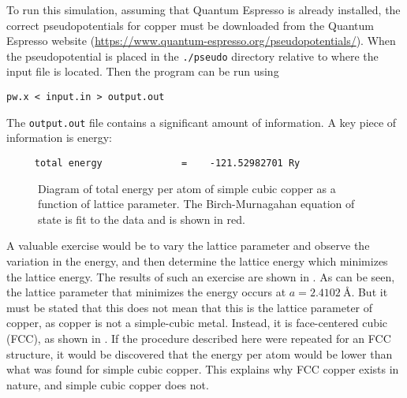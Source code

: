 To run this simulation, assuming that Quantum Espresso is already installed,
the correct pseudopotentials for copper must be downloaded from the
Quantum Espresso
website
(\href{https://www.quantum-espresso.org/pseudopotentials/}{https://www.quantum-espresso.org/pseudopotentials/}).
When the pseudopotential is placed in the \texttt{./pseudo} directory relative
to where the input file is located. Then the program can be run using

\begin{tcolorbox}[colback=gray!10, colframe=gray!30, boxrule=0.5pt, breakable]
\begin{verbatim}
pw.x < input.in > output.out
\end{verbatim}
\end{tcolorbox}

The \texttt{output.out} file contains a significant amount of information. A key
piece of information is energy:

\begin{tcolorbox}[colback=gray!10, colframe=gray!30, boxrule=0.5pt, breakable]
\begin{verbatim}
     total energy              =    -121.52982701 Ry
\end{verbatim}
\end{tcolorbox}

\begin{figure}[t]
\centering

\caption{Diagram of total energy per atom of simple cubic copper as
  a function of lattice parameter. The Birch-Murnagahan equation
of state is fit to the data and is shown in red.}
\label{fig:cu_cubic}
\end{figure}

A valuable exercise would be to vary the lattice parameter and observe the
variation in the energy, and then determine the lattice energy which minimizes
the lattice energy. The results of such an exercise are shown in
. As can be seen, the lattice parameter that minimizes the
energy occurs at $a = \SI{2.4102}{\angstrom}$. But it must be stated that
this does not mean that this is the lattice parameter of copper, as copper
is not a simple-cubic metal. Instead, it is face-centered cubic
(FCC), as shown in . If the procedure described here were
repeated for an FCC structure, it would be discovered that the energy
per atom would be lower than what was found for simple cubic copper.
This explains why FCC copper exists in nature, and simple cubic copper does not.

